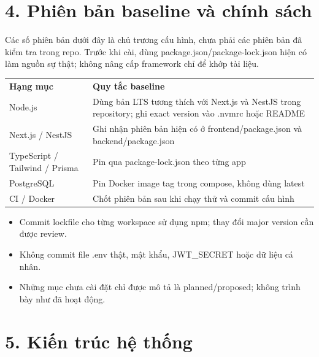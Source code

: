\documentclass[11pt,a4paper,oneside]{report}
\begin{document}
\section{\texorpdfstring{\textbf{4. Phiên bản baseline và chính sách}}{4. Phiên bản baseline và chính sách}}\label{05-techstack:phiuxean-bux1ea3n-baseline-vuxe0-chuxednh-suxe1ch}

Các số phiên bản dưới đây là chủ trương cấu hình, chưa phải các phiên bản đã kiểm tra trong repo. Trước khi cài, dùng package.json/package-lock.json hiện có làm nguồn sự thật; không nâng cấp framework chỉ để khớp tài liệu.

\begin{longtable}[]{@{}
  >{\raggedright\arraybackslash}p{}
  >{\raggedright\arraybackslash}p{}@{}}
\toprule\noalign{}
\endhead
\bottomrule\noalign{}
\endlastfoot
\textbf{Hạng mục} & \textbf{Quy tắc baseline} \\
Node.js & Dùng bản LTS tương thích với Next.js và NestJS trong repository; ghi exact version vào .nvmrc hoặc README \\
Next.js / NestJS & Ghi nhận phiên bản hiện có ở frontend/package.json và backend/package.json \\
TypeScript / Tailwind / Prisma & Pin qua package-lock.json theo từng app \\
PostgreSQL & Pin Docker image tag trong compose, không dùng latest \\
CI / Docker & Chốt phiên bản sau khi chạy thử và commit cấu hình \\
\end{longtable}

\begin{itemize}
\item
  Commit lockfile cho từng workspace sử dụng npm; thay đổi major version cần được review.
\item
  Không commit file .env thật, mật khẩu, JWT\_SECRET hoặc dữ liệu cá nhân.
\item
  Những mục chưa cài đặt chỉ được mô tả là planned/proposed; không trình bày như đã hoạt động.
\end{itemize}

\section{\texorpdfstring{\textbf{5. Kiến trúc hệ thống}}{5. Kiến trúc hệ thống}}\label{05-techstack:kiux1ebfn-truxfac-hux1ec7-thux1ed1ng}
\end{document}
